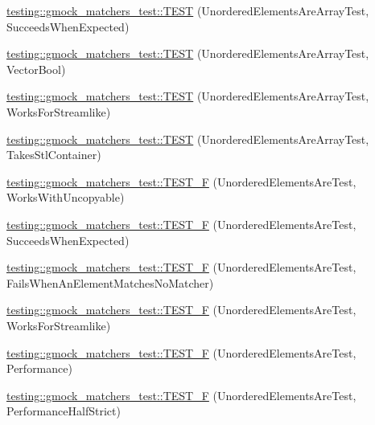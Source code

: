 \begin{DoxyCompactItemize}
\item 
\hyperlink{namespacetesting_1_1gmock__matchers__test_adb7e47654f1536fc049243f765292825}{testing\+::gmock\+\_\+matchers\+\_\+test\+::\+T\+E\+ST} (Unordered\+Elements\+Are\+Array\+Test, Succeeds\+When\+Expected)
\item 
\hyperlink{namespacetesting_1_1gmock__matchers__test_a3d7df4fa0dd3e8247f4c2d4b02d801f0}{testing\+::gmock\+\_\+matchers\+\_\+test\+::\+T\+E\+ST} (Unordered\+Elements\+Are\+Array\+Test, Vector\+Bool)
\item 
\hyperlink{namespacetesting_1_1gmock__matchers__test_a1ff2a93a8f031a5b23dbc699a462043b}{testing\+::gmock\+\_\+matchers\+\_\+test\+::\+T\+E\+ST} (Unordered\+Elements\+Are\+Array\+Test, Works\+For\+Streamlike)
\item 
\hyperlink{namespacetesting_1_1gmock__matchers__test_aa3a960ec78e2b1e860c305f4598f39ec}{testing\+::gmock\+\_\+matchers\+\_\+test\+::\+T\+E\+ST} (Unordered\+Elements\+Are\+Array\+Test, Takes\+Stl\+Container)
\item 
\hyperlink{namespacetesting_1_1gmock__matchers__test_ab09132c3b991b8f104f3091370d2fe55}{testing\+::gmock\+\_\+matchers\+\_\+test\+::\+T\+E\+S\+T\+\_\+F} (Unordered\+Elements\+Are\+Test, Works\+With\+Uncopyable)
\item 
\hyperlink{namespacetesting_1_1gmock__matchers__test_a177c3db59da001df2441deb1ddb083af}{testing\+::gmock\+\_\+matchers\+\_\+test\+::\+T\+E\+S\+T\+\_\+F} (Unordered\+Elements\+Are\+Test, Succeeds\+When\+Expected)
\item 
\hyperlink{namespacetesting_1_1gmock__matchers__test_a62fd481b1160a667c785e6009ff87163}{testing\+::gmock\+\_\+matchers\+\_\+test\+::\+T\+E\+S\+T\+\_\+F} (Unordered\+Elements\+Are\+Test, Fails\+When\+An\+Element\+Matches\+No\+Matcher)
\item 
\hyperlink{namespacetesting_1_1gmock__matchers__test_a2affca2a152e4537c2f06518eaa2eac5}{testing\+::gmock\+\_\+matchers\+\_\+test\+::\+T\+E\+S\+T\+\_\+F} (Unordered\+Elements\+Are\+Test, Works\+For\+Streamlike)
\item 
\hyperlink{namespacetesting_1_1gmock__matchers__test_a074ca2babea203d1a54d69ff1fde5c59}{testing\+::gmock\+\_\+matchers\+\_\+test\+::\+T\+E\+S\+T\+\_\+F} (Unordered\+Elements\+Are\+Test, Performance)
\item 
\hyperlink{namespacetesting_1_1gmock__matchers__test_a4437de9d40efd87f73b738ef38c2d70f}{testing\+::gmock\+\_\+matchers\+\_\+test\+::\+T\+E\+S\+T\+\_\+F} (Unordered\+Elements\+Are\+Test, Performance\+Half\+Strict)
\item 

\end{DoxyCompactItemize}

